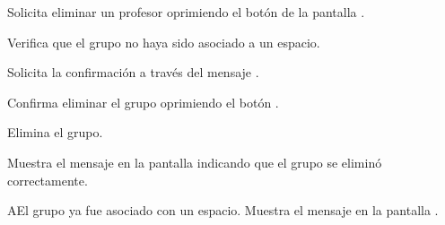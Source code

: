 \begin{UCtrayectoria}
	\UCpaso [\UCactor] Solicita eliminar un profesor oprimiendo el botón  
	de la pantalla .
	
	\UCpaso [\UCsist] Verifica que el grupo no haya sido asociado a un espacio. 
	
	\UCpaso [\UCsist] Solicita la confirmación a través del mensaje .
	
	\UCpaso [\UCactor] Confirma eliminar el grupo oprimiendo el botón .
	
	\UCpaso [\UCsist] Elimina el grupo.
	
	\UCpaso [\UCsist] Muestra el mensaje  en la pantalla  indicando que el grupo se eliminó correctamente.	
	
\end{UCtrayectoria}

\begin{UCtrayectoriaA}{A}{El grupo ya fue asociado con un espacio.}
	\UCpaso [\UCsist] Muestra el mensaje  en la pantalla . 
\end{UCtrayectoriaA}
